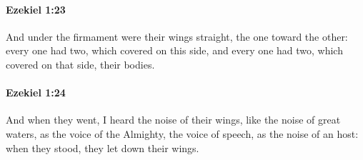 		\paragraph{Ezekiel 1:23} %
			\label{EZEKIEL-1-23}

			And under the firmament were their wings straight, the one toward the other: every one had two, which covered on this side, and every one had two, which covered on that side, their bodies.


		\paragraph{Ezekiel 1:24} %
			\label{EZEKIEL-1-24}

			And when they went, I heard the noise of their wings, like the noise of great waters, as the voice of the Almighty, the voice of speech, as the noise of an host: when they stood, they let down their wings.

